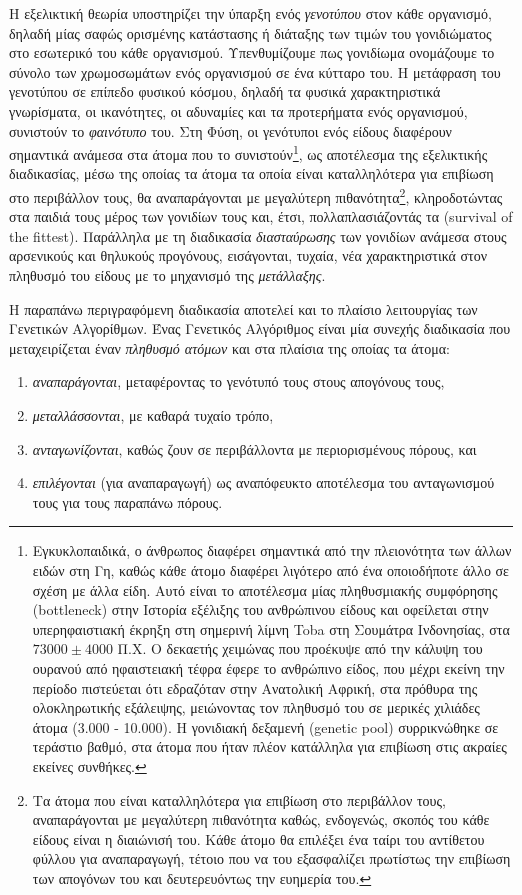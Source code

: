 Η εξελικτική θεωρία υποστηρίζει την ύπαρξη ενός \emph{γενοτύπου} στον κάθε οργανισμό, δηλαδή μίας σαφώς ορισμένης κατάστασης ή διάταξης των τιμών του γονιδιώματος στο εσωτερικό του κάθε οργανισμού. Υπενθυμίζουμε πως γονιδίωμα ονομάζουμε το σύνολο των χρωμοσωμάτων ενός οργανισμού σε ένα κύτταρο του. Η μετάφραση του γενοτύπου σε επίπεδο φυσικού κόσμου, δηλαδή τα φυσικά χαρακτηριστικά γνωρίσματα, οι ικανότητες, οι αδυναμίες και τα προτερήματα ενός οργανισμού, συνιστούν το \emph{φαινότυπο} του. Στη Φύση, οι γενότυποι ενός είδους διαφέρουν σημαντικά ανάμεσα στα άτομα που το συνιστούν\footnote{Εγκυκλοπαιδικά, ο άνθρωπος διαφέρει σημαντικά από την πλειονότητα των άλλων ειδών στη Γη, καθώς κάθε άτομο διαφέρει λιγότερο από ένα οποιοδήποτε άλλο σε σχέση με άλλα είδη. Αυτό είναι το αποτέλεσμα μίας πληθυσμιακής συμφόρησης (bottleneck) στην Ιστορία εξέλιξης του ανθρώπινου είδους και οφείλεται στην υπερηφαιστιακή έκρηξη στη σημερινή λίμνη Toba στη Σουμάτρα Ινδονησίας, στα $73000\pm4000$ Π.Χ. Ο δεκαετής χειμώνας που προέκυψε από την κάλυψη του ουρανού από ηφαιστειακή τέφρα έφερε το ανθρώπινο είδος, που μέχρι εκείνη την περίοδο πιστεύεται ότι εδραζόταν στην Ανατολική Αφρική, στα πρόθυρα της ολοκληρωτικής εξάλειψης, μειώνοντας τον πληθυσμό του σε μερικές χιλιάδες άτομα (3.000 - 10.000). Η γονιδιακή δεξαμενή (genetic pool) συρρικνώθηκε σε τεράστιο βαθμό, στα άτομα που ήταν πλέον κατάλληλα για επιβίωση στις ακραίες εκείνες συνθήκες.}, ως αποτέλεσμα της εξελικτικής διαδικασίας, μέσω της οποίας τα άτομα τα οποία είναι καταλληλότερα για επιβίωση στο περιβάλλον τους, θα αναπαράγονται με μεγαλύτερη πιθανότητα\footnote{Τα άτομα που είναι καταλληλότερα για επιβίωση στο περιβάλλον τους, αναπαράγονται με μεγαλύτερη πιθανότητα καθώς, ενδογενώς, σκοπός του κάθε είδους είναι η διαιώνισή του. Κάθε άτομο θα επιλέξει ένα ταίρι του αντίθετου φύλλου για αναπαραγωγή, τέτοιο που να του εξασφαλίζει πρωτίστως την επιβίωση των απογόνων του και δευτερευόντως την ευημερία του.}, κληροδοτώντας στα παιδιά τους μέρος των γονιδίων τους και, έτσι, πολλαπλασιάζοντάς τα (survival of the fittest). Παράλληλα με τη διαδικασία \textit{διασταύρωσης} των γονιδίων ανάμεσα στους αρσενικούς και θηλυκούς προγόνους, εισάγονται, τυχαία, νέα χαρακτηριστικά στον πληθυσμό του είδους με το μηχανισμό της \textit{μετάλλαξης}.

Η παραπάνω περιγραφόμενη διαδικασία αποτελεί και το πλαίσιο λειτουργίας των Γενετικών Αλγορίθμων. Ένας Γενετικός Αλγόριθμος είναι μία συνεχής διαδικασία που μεταχειρίζεται έναν \emph{πληθυσμό ατόμων} και στα πλαίσια της οποίας τα άτομα:
\begin{enumerate}
\item\emph{αναπαράγονται}, μεταφέροντας το γενότυπό τους στους απογόνους τους,
\item\emph{μεταλλάσσονται}, με καθαρά τυχαίο τρόπο,
\item\emph{ανταγωνίζονται}, καθώς ζουν σε περιβάλλοντα με περιορισμένους πόρους, και 
\item\emph{επιλέγονται} (για αναπαραγωγή) ως αναπόφευκτο αποτέλεσμα του ανταγωνισμού τους για τους παραπάνω πόρους.
\end{enumerate}

